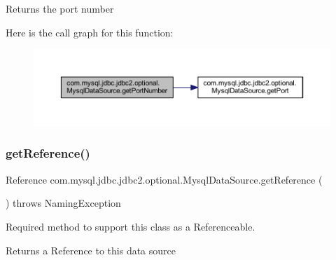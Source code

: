 \begin{DoxyReturn}{Returns}
the port number 
\end{DoxyReturn}
Here is the call graph for this function\+:
\nopagebreak
\begin{figure}[H]
\begin{center}
\leavevmode
\includegraphics[width=350pt]{classcom_1_1mysql_1_1jdbc_1_1jdbc2_1_1optional_1_1_mysql_data_source_ae5f33a812875972ef3269a3c0681c600_cgraph}
\end{center}
\end{figure}
\mbox{\label{classcom_1_1mysql_1_1jdbc_1_1jdbc2_1_1optional_1_1_mysql_data_source_a75a3ebb597b5c7d7ab881e9253470ef8}} 
\subsubsection{\texorpdfstring{get\+Reference()}{getReference()}}
{\footnotesize\ttfamily Reference com.\+mysql.\+jdbc.\+jdbc2.\+optional.\+Mysql\+Data\+Source.\+get\+Reference (\begin{DoxyParamCaption}{ }\end{DoxyParamCaption}) throws Naming\+Exception}

Required method to support this class as a {\ttfamily Referenceable}.

\begin{DoxyReturn}{Returns}
a Reference to this data source
\end{DoxyReturn}


